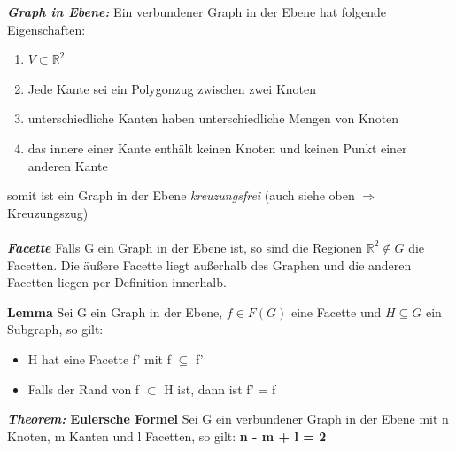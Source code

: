 \textbf{\textit{Graph in Ebene:}} \newline
Ein verbundener Graph in der Ebene hat folgende Eigenschaften:
\begin{enumerate}
	\item $V \subset \mathbb{R}^2$
	\item Jede Kante sei ein Polygonzug zwischen zwei Knoten
	\item unterschiedliche Kanten haben unterschiedliche Mengen von Knoten
	\item das innere einer Kante enthält keinen Knoten und keinen Punkt einer anderen Kante 
\end{enumerate}
somit ist ein Graph in der Ebene \textit{kreuzungsfrei} (auch siehe oben $\Rightarrow$ Kreuzungszug)
\\\\
\textbf{\textit{Facette}}\newline
Falls G ein Graph in der Ebene ist, so sind die Regionen $\mathbb{R}^2 \notin G$ die Facetten. Die äußere Facette liegt außerhalb des Graphen und die anderen Facetten liegen per Definition innerhalb. \newline

\newpage
\textbf{Lemma} \newline
Sei G ein Graph in der Ebene, $f \in F(G)$ eine Facette und $H \subseteq G$ ein Subgraph, so gilt:
\begin{itemize}
	\item H hat eine Facette f' mit f $\subseteq$ f'
	\item Falls der Rand von f $\subset$ H ist, dann ist f' = f
\end{itemize}

\textbf{\textit{Theorem:} Eulersche Formel} \newline
Sei G ein verbundener Graph in der Ebene mit n Knoten, m Kanten und l Facetten, so gilt: \textbf{n - m + l = 2} \newline

